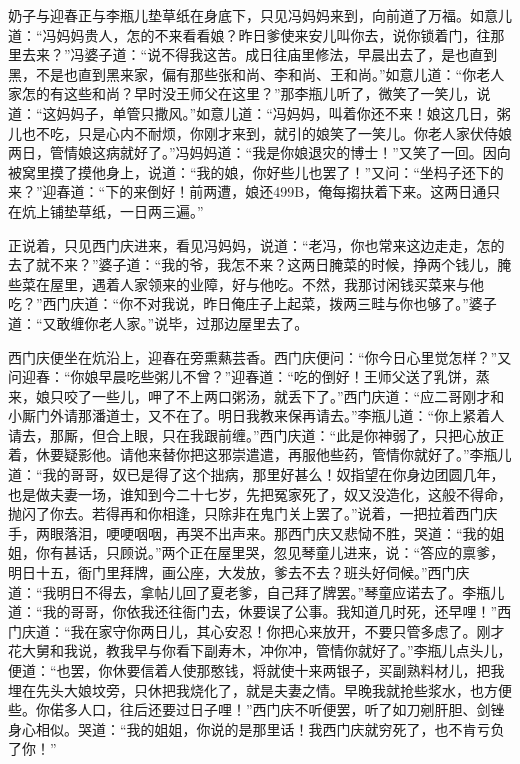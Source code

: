 奶子与迎春正与李瓶儿垫草纸在身底下，只见冯妈妈来到，向前道了万福。如意儿道：“冯妈妈贵人，怎的不来看看娘？昨日爹使来安儿叫你去，说你锁着门，往那里去来？”冯婆子道：“说不得我这苦。成日往庙里修法，早晨出去了，是也直到黑，不是也直到黑来家，偏有那些张和尚、李和尚、王和尚。”如意儿道：“你老人家怎的有这些和尚？早时没王师父在这里？”那李瓶儿听了，微笑了一笑儿，说道：“这妈妈子，单管只撒风。”如意儿道：“冯妈妈，叫着你还不来！娘这几日，粥儿也不吃，只是心内不耐烦，你刚才来到，就引的娘笑了一笑儿。你老人家伏侍娘两日，管情娘这病就好了。”冯妈妈道：“我是你娘退灾的博士！”又笑了一回。因向被窝里摸了摸他身上，说道：“我的娘，你好些儿也罢了！”又问：“坐杩子还下的来？”迎春道：“下的来倒好！前两遭，娘还\def\textMenZuo \textuni{499B}，俺每搊扶着下来。这两日通只在炕上铺垫草纸，一日两三遍。”

正说着，只见西门庆进来，看见冯妈妈，说道：“老冯，你也常来这边走走，怎的去了就不来？”婆子道：“我的爷，我怎不来？这两日腌菜的时候，挣两个钱儿，腌些菜在屋里，遇着人家领来的业障，好与他吃。不然，我那讨闲钱买菜来与他吃？”西门庆道：“你不对我说，昨日俺庄子上起菜，拨两三畦与你也够了。”婆子道：“又敢缠你老人家。”说毕，过那边屋里去了。

西门庆便坐在炕沿上，迎春在旁熏爇芸香。西门庆便问：“你今日心里觉怎样？”又问迎春：“你娘早晨吃些粥儿不曾？”迎春道：“吃的倒好！王师父送了乳饼，蒸来，娘只咬了一些儿，呷了不上两口粥汤，就丢下了。”西门庆道：“应二哥刚才和小厮门外请那潘道士，又不在了。明日我教来保再请去。”李瓶儿道：“你上紧着人请去，那厮，但合上眼，只在我跟前缠。”西门庆道：“此是你神弱了，只把心放正着，休要疑影他。请他来替你把这邪崇遣遣，再服他些药，管情你就好了。”李瓶儿道：“我的哥哥，奴已是得了这个拙病，那里好甚么！奴指望在你身边团圆几年，也是做夫妻一场，谁知到今二十七岁，先把冤家死了，奴又没造化，这般不得命，抛闪了你去。若得再和你相逢，只除非在鬼门关上罢了。”说着，一把拉着西门庆手，两眼落泪，哽哽咽咽，再哭不出声来。那西门庆又悲恸不胜，哭道：“我的姐姐，你有甚话，只顾说。”两个正在屋里哭，忽见琴童儿进来，说：“答应的禀爹，明日十五，衙门里拜牌，画公座，大发放，爹去不去？班头好伺候。”西门庆道：“我明日不得去，拿帖儿回了夏老爹，自己拜了牌罢。”琴童应诺去了。李瓶儿道：“我的哥哥，你依我还往衙门去，休要误了公事。我知道几时死，还早哩！”西门庆道：“我在家守你两日儿，其心安忍！你把心来放开，不要只管多虑了。刚才花大舅和我说，教我早与你看下副寿木，冲你冲，管情你就好了。”李瓶儿点头儿，便道：“也罢，你休要信着人使那憨钱，将就使十来两银子，买副熟料材儿，把我埋在先头大娘坟旁，只休把我烧化了，就是夫妻之情。早晚我就抢些浆水，也方便些。你偌多人口，往后还要过日子哩！”西门庆不听便罢，听了如刀剜肝胆、剑锉身心相似。哭道：“我的姐姐，你说的是那里话！我西门庆就穷死了，也不肯亏负了你！”


